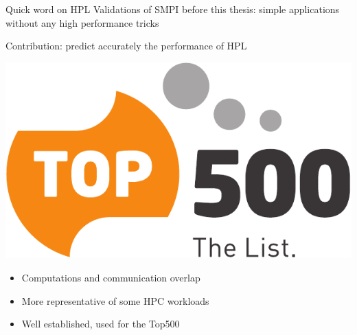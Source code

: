 \documentclass[10pt]{beamer}
\begin{document}
\begin{frame}[fragile]{Quick word on HPL}
    Validations of SMPI before this thesis: simple applications without any high performance tricks
    \pause

    Contribution: predict accurately the performance of HPL

    \begin{minipage}[b][0.2\textheight][c]{.2\linewidth}
        \includegraphics[width=\linewidth]{img/slides/top_500.pdf}
    \end{minipage} \hfill %
    \begin{minipage}[b][0.2\textheight][t]{0.78\linewidth}
        \begin{itemize}
            \item Computations and communication overlap
            \item More representative of some HPC workloads
            \item Well established, used for the Top500
        \end{itemize}
    \end{minipage}
    \vfill
    \pause


\end{frame}
\end{document}
